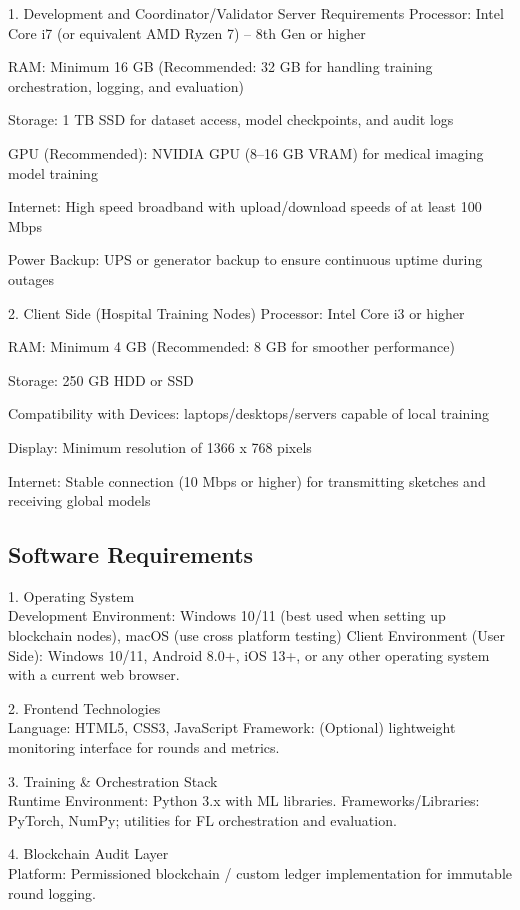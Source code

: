 1. Development and Coordinator/Validator Server Requirements
Processor: Intel Core i7 (or equivalent AMD Ryzen 7) – 8th Gen or higher

RAM: Minimum 16 GB (Recommended: 32 GB for handling training orchestration, logging, and evaluation)

Storage: 1 TB SSD for dataset access, model checkpoints, and audit logs

GPU (Recommended): NVIDIA GPU (8--16 GB VRAM) for medical imaging model training

Internet: High speed broadband with upload/download speeds of at least 100 Mbps

Power Backup: UPS or generator backup to ensure continuous uptime during outages

2. Client Side (Hospital Training Nodes)
Processor: Intel Core i3 or higher

RAM: Minimum 4 GB (Recommended: 8 GB for smoother performance)

Storage: 250 GB HDD or SSD

Compatibility with Devices: laptops/desktops/servers capable of local training

Display: Minimum resolution of 1366 x 768 pixels

Internet: Stable connection (10 Mbps or higher) for transmitting sketches and receiving global models



\subsection{Software Requirements}

1. Operating System\\
Development Environment:
Windows 10/11 (best used when setting up blockchain nodes), macOS (use cross platform testing)
Client Environment (User Side):
Windows 10/11, Android 8.0+, iOS 13+, or any other operating system with a current web browser.

2. Frontend Technologies\\
Language: HTML5, CSS3, JavaScript
Framework: (Optional) lightweight monitoring interface for rounds and metrics.

3. Training \& Orchestration Stack\\
Runtime Environment: Python 3.x with ML libraries.
Frameworks/Libraries: PyTorch, NumPy; utilities for FL orchestration and evaluation.

4. Blockchain Audit Layer\\
Platform: Permissioned blockchain / custom ledger implementation for immutable round logging.


